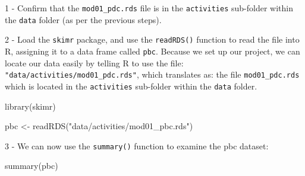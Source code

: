 \documentclass[
  a4paper,
]{memoir}
\newenvironment{Shaded}{\begin{snugshade}}{\end{snugshade}}
\newcommand{\FunctionTok}[1]{\textcolor[rgb]{0.00,0.00,0.00}{#1}}
\newcommand{\NormalTok}[1]{\textcolor[rgb]{0.00,0.00,0.00}{#1}}
\newcommand{\OtherTok}[1]{\textcolor[rgb]{0.00,0.00,0.00}{#1}}
\newcommand{\StringTok}[1]{\textcolor[rgb]{0.00,0.00,0.00}{#1}}
\begin{document}
\begin{tcolorbox}[enhanced jigsaw, arc=.35mm, bottomrule=.15mm, bottomtitle=1mm, breakable, colback=white, colbacktitle=quarto-callout-note-color!10!white, colframe=quarto-callout-note-color-frame, coltitle=black, left=2mm, leftrule=.75mm, opacityback=0, opacitybacktitle=0.6, rightrule=.15mm, title={TASK}, titlerule=0mm, toprule=.15mm, toptitle=1mm]

1 - Confirm that the \texttt{mod01\_pdc.rds} file is in the
\texttt{activities} sub-folder within the \texttt{data} folder (as per
the previous steps).

2 - Load the \texttt{skimr} package, and use the \texttt{readRDS()}
function to read the file into R, assigning it to a data frame called
\texttt{pbc}. Because we set up our project, we can locate our data
easily by telling R to use the file:
\texttt{"data/activities/mod01\_pdc.rds"}, which translates as: the file
\texttt{mod01\_pdc.rds} which is located in the \texttt{activities}
sub-folder within the \texttt{data} folder.

\begin{Shaded}
\begin{Highlighting}[]
\FunctionTok{library}\NormalTok{(skimr)}

\NormalTok{pbc }\OtherTok{\textless{}{-}} \FunctionTok{readRDS}\NormalTok{(}\StringTok{"data/activities/mod01\_pbc.rds"}\NormalTok{)}
\end{Highlighting}
\end{Shaded}

3 - We can now use the \texttt{summary()} function to examine the pbc
dataset:

\begin{Shaded}
\begin{Highlighting}[]
\FunctionTok{summary}\NormalTok{(pbc)}
\end{Highlighting}
\end{Shaded}


\end{tcolorbox}
\end{document}
